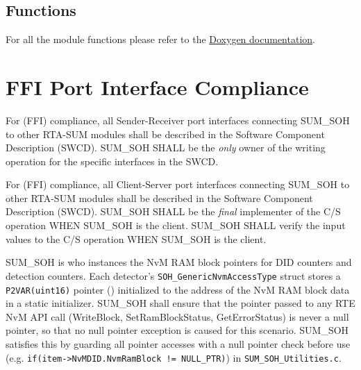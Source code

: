\subsection{Functions}
For all the module functions please refer to the \href{doxygen/html/globals_func.html}{Doxygen documentation}.

\section{FFI Port Interface Compliance}
\label{sec:ffiportcompliance}


For (FFI) compliance, all Sender-Receiver port interfaces connecting SUM\_SOH to other RTA-SUM modules shall be described in the Software Component Description (SWCD).
SUM\_SOH SHALL be the \textit{only} owner of the writing operation for the specific interfaces in the SWCD.

{ }


For (FFI) compliance, all Client-Server port interfaces connecting SUM\_SOH to other RTA-SUM modules shall be described in the Software Component Description (SWCD).
SUM\_SOH SHALL be the \textit{final} implementer of the C/S operation WHEN SUM\_SOH is the client. SUM\_SOH SHALL verify the input values to the C/S operation WHEN SUM\_SOH is the client.

{  }


SUM\_SOH is who instances the NvM RAM block pointers for DID counters and detection counters. Each detector's \texttt{SOH\_GenericNvmAccessType} struct stores a \texttt{P2VAR(uint16)} pointer () initialized to the address of the NvM RAM block data in a static initializer. SUM\_SOH shall ensure that the pointer passed to any RTE NvM API call (WriteBlock, SetRamBlockStatus, GetErrorStatus) is never a null pointer, so that no null pointer exception is caused for this scenario.
SUM\_SOH satisfies this by guarding all  pointer accesses with a null pointer check before use (e.g. \texttt{if(item->NvMDID.NvmRamBlock != NULL\_PTR)}) in \texttt{SUM\_SOH\_Utilities.c}.

{ }